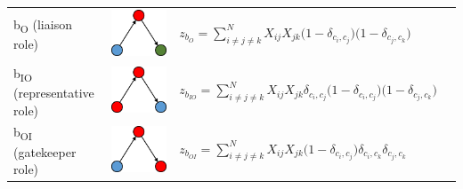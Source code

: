 \begin{table}
{\begin{threeparttable}
\begin{tabular}{l c l l}
b\textsubscript{O} (liaison role) & \begin{minipage}{.12\textwidth} \centering \includegraphics[width=0.4\linewidth]{Images/b_O} \end{minipage} & $ z_{b_O} = \sum_{i \neq j \neq k}^N X_{ij} X_{jk} \bigg(1 - \delta_{c_i,c_j} \bigg) \bigg(1 - \delta_{c_j,c_k} \bigg) $ & \\
b\textsubscript{IO} (representative role) & \begin{minipage}{.12\textwidth} \centering \includegraphics[width=0.4\linewidth]{Images/b_IO} \end{minipage} & $ z_{b_{IO}} = \sum_{i \neq j \neq k}^N X_{ij} X_{jk} \delta_{c_i,c_j} \bigg(1 - \delta_{c_i,c_j} \bigg) \bigg(1 - \delta_{c_j,c_k} \bigg) $ & \\
b\textsubscript{OI} (gatekeeper role) & \begin{minipage}{.12\textwidth} \centering \includegraphics[width=0.4\linewidth]{Images/b_OI} \end{minipage} & $ z_{b_{OI}} = \sum_{i \neq j \neq k}^N X_{ij} X_{jk} \bigg(1 - \delta_{c_i,c_j} \bigg) \delta_{c_i,c_k} \delta_{c_j,c_k} $ & \\

\end{tabular}
\end{threeparttable}}
\end{table}
